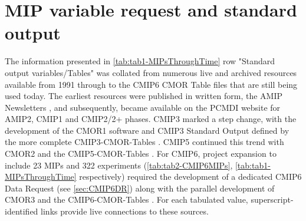 \documentclass[gmd, preprint]{copernicus}
\begin{document}
\section{MIP variable request and standard output}  %
\label{sec:secAppB1-MIPStandardOutput}
The information presented in \autoref{tab:tab1-MIPsThroughTime} row "Standard output variables/Tables" was collated from numerous live and archived resources available from 1991 through to the CMIP6 CMOR Table files that are still being used today. The earliest resources were published in written form, the AMIP Newsletters \citep[e.g.,][]{gates_amip_1991}, and subsequently, became available on the PCMDI website for AMIP2, CMIP1 and CMIP2/2+ phases. CMIP3 marked a step change, with the development of the CMOR1 software \citep{taylor_cmor_2006} and CMIP3 Standard Output defined by the more complete CMIP3-CMOR-Tables \citep{doutriaux_cmip3_2005}. CMIP5 continued this trend with CMOR2 \citep{doutriaux_cmor_2011} and the CMIP5-CMOR-Tables \citep{doutriaux_cmip5_2013}. For CMIP6, project expansion to include 23 MIPs and 322 experiments (\autoref{tab:tab2-CMIP6MIPs}, \autoref{tab:tab1-MIPsThroughTime} respectively) required the development of a dedicated CMIP6 Data Request (see \autoref{sec:CMIP6DR}) along with the parallel development of CMOR3 \citep{mauzey_cmor_2024} and the CMIP6-CMOR-Tables \citep{nadeau_cmip6_2017}. For each tabulated value, superscript-identified links provide live connections to these sources.
\end{document}
